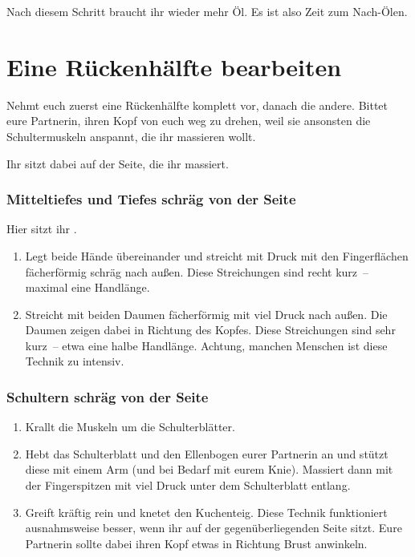 Nach diesem Schritt braucht ihr wieder mehr Öl. Es ist also Zeit zum Nach-Ölen.

\section{Eine Rückenhälfte bearbeiten}

Nehmt euch zuerst eine Rückenhälfte komplett vor, danach die andere. Bittet eure Partnerin, ihren Kopf von euch weg zu drehen, weil sie ansonsten die Schultermuskeln anspannt, die ihr massieren wollt.

Ihr sitzt dabei auf der Seite, die ihr massiert.

\subsubsection{Mitteltiefes und Tiefes schräg von der Seite}

Hier sitzt ihr .

\begin{oframed}
  \begin{enumerate}
    \item {} Legt beide Hände übereinander und streicht mit Druck mit den Fingerflächen fächerförmig schräg nach außen. Diese Streichungen sind recht kurz~-- maximal eine Handlänge.
    \item {} Streicht mit beiden Daumen fächerförmig mit viel Druck nach außen. Die Daumen zeigen dabei in Richtung des Kopfes. Diese Streichungen sind sehr kurz~-- etwa eine halbe Handlänge. Achtung, manchen Menschen ist diese Technik zu intensiv.
  \end{enumerate}
\end{oframed}

\subsubsection{Schultern schräg von der Seite}

\begin{oframed}
  \begin{enumerate}
    \item {} Krallt die Muskeln um die Schulterblätter.
    \item {} Hebt das Schulterblatt und den Ellenbogen eurer Partnerin an und stützt diese mit einem Arm (und bei Bedarf mit eurem Knie). Massiert dann mit der Fingerspitzen mit viel Druck unter dem Schulterblatt entlang.
    \item {} Greift kräftig rein und knetet den Kuchenteig. Diese Technik funktioniert ausnahmsweise besser, wenn ihr auf der gegenüberliegenden Seite sitzt. Eure Partnerin sollte dabei ihren Kopf etwas in Richtung Brust anwinkeln.
  \end{enumerate}
\end{oframed}


